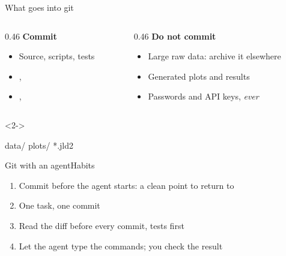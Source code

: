 \begin{frame}[fragile]{What goes into git}
  \begin{columns}[T]
    \begin{column}{0.46\textwidth}
      \textbf{Commit}
      \begin{itemize}
        \item Source, scripts, tests
        \item {}, 
        \item {}, 
      \end{itemize}
    \end{column}
    \begin{column}{0.46\textwidth}
      \textbf{Do not commit}
      \begin{itemize}
        \item Large raw data: archive it elsewhere
        \item Generated plots and results
        \item Passwords and API keys, \emph{ever}
      \end{itemize}
    \end{column}
  \end{columns}
  \vspace{1ex}
\begin{onlyenv}<2->
\begin{terminal}[title={\hfill\tiny\color{unibasGrey}\smallcapsline{.gitignore}}]
data/
plots/
*.jld2
\end{terminal}
\end{onlyenv}
\end{frame}

\begin{frame}[fragile]{Git with an agent}{Habits}
  \begin{enumerate}
    \item Commit before the agent starts: a clean point to return to
    \item<2-> One task, one commit
    \item<3-> Read the diff before every commit, tests first
    \item<4-> Let the agent type the commands; you check the result
  \end{enumerate}
\end{frame}

